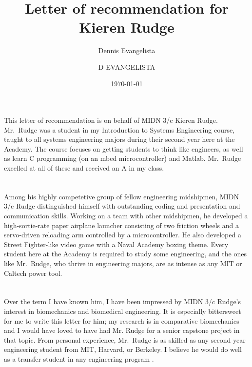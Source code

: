 \documentclass[12pt,courier]{navyletter}
\author{Dennis Evangelista}
\title{Letter of recommendation for Kieren Rudge}
\date{\today}
\begin{document}
\makedateblock{}

\begin{navyletterheader}
\navyskip{}%
\navysubjline%
\end{navyletterheader}

\section{}
This letter of recommendation is on behalf of MIDN 3/c Kieren Rudge.  Mr.~Rudge was a student in my Introduction to Systems Engineering course, taught to all systems engineering majors during their second year here at the Academy. The course focuses on getting students to think like engineers, as well as learn C programming (on an mbed microcontroller) and Matlab. Mr.~Rudge excelled at all of these and received an A in my class. 

\section{} 
Among his highly competetive group of fellow engineering midshipmen, MIDN 3/c Rudge distinguished himself with outstanding coding and presentation and communication skills.  Working on a team with other midshipmen, he developed a high-sortie-rate paper airplane launcher consisting of two friction wheels and a servo-driven reloading arm controlled by a microcontroller.   He also developed a Street Fighter-like video game with a Naval Academy boxing theme.  Every student here at the Academy is required to study some engineering, and the ones like Mr.~Rudge, who thrive in engineering majors, are as intense as any MIT or Caltech power tool.  

\section{}
Over the term I have known him, I have been impressed by MIDN 3/c Rudge's interest in biomechanics and biomedical engineering.  It is especially bittersweet for me to write this letter for him; my research is in comparative biomechanics and I would have loved to have had Mr. Rudge for a senior capstone project in that topic.  From personal experience, Mr.~Rudge is as skilled as any second year engineering student from MIT, Harvard, or Berkeley.  I believe he would do well as a transfer student in any engineering program . 


\noclosing{}\\
\noindent\hspace*{4in}
\signature{D EVANGELISTA}

\end{document}
